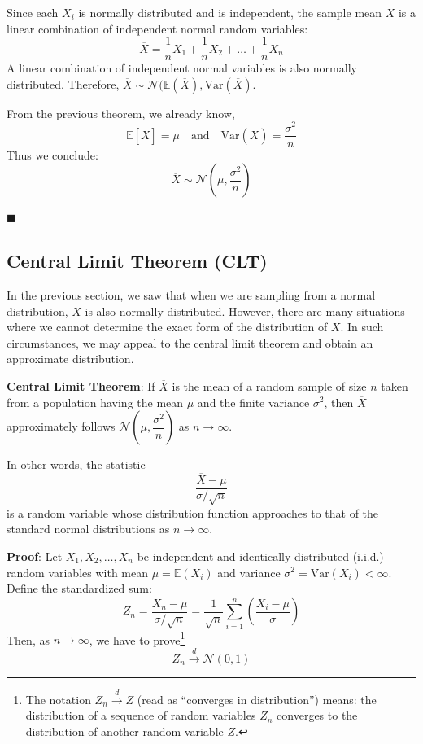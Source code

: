 \documentclass[twoside]{book}
\begin{document}
Since each \( X_i \) is normally distributed and is independent, the sample mean \( \overline{X} \) is a linear combination of independent normal random variables:
\[
\overline{X} = \frac{1}{n} X_1 + \frac{1}{n} X_2 + \dots + \frac{1}{n} X_n
\]
A linear combination of independent normal variables is also normally distributed. Therefore, \( \overline{X} \sim \mathcal{N}(\mathbb{E}(\overline{X}), \mathrm{Var}(\overline{X}) \).

From the previous theorem, we already know,
\[
\mathbb{E}[\overline{X}] = \mu \quad \text{and} \quad \mathrm{Var}(\overline{X}) = \frac{\sigma^2}{n}
\]
Thus we conclude:
\[
\overline{X} \sim \mathcal{N}\left( \mu, \frac{\sigma^2}{n} \right)
\]

\hfill $\blacksquare$
\subsection{Central Limit Theorem (CLT)}
In the previous section, we saw that when we are sampling from a normal distribution, $X$ is also normally distributed. However, there are many situations where we cannot determine the exact form of the distribution of
$X$. In such circumstances, we may appeal to the central limit theorem and obtain an approximate distribution.

\begin{textbox}
\textbf{Central Limit Theorem}: If $\overline{X}$ is the mean of a random sample of size $n$ taken from a population having the mean $\mu$ and the finite variance $\sigma^2$, then $\overline{X}$ approximately follows $\mathcal{N}\left(\mu, \dfrac{\sigma^2}{n}\right)$ as $n \to \infty$.

In other words, the statistic
$$\dfrac{\overline{X}-\mu}{{\sigma}/{\sqrt{n}}}$$
is a random variable whose distribution function approaches to that of the standard normal distributions as $n \to \infty$.
\end{textbox}
\textbf{Proof}: Let $X_1, X_2, \dots, X_n$ be independent and identically distributed (i.i.d.) random variables with mean $\mu = \mathbb{E}(X_i)$ and variance $\sigma^2 = \text{Var}(X_i) < \infty$. Define the standardized sum:
\[
Z_n = \frac{\overline{X}_n - \mu}{\sigma / \sqrt{n}} = \frac{1}{\sqrt{n}} \sum_{i=1}^n \left( \frac{X_i - \mu}{\sigma} \right)
\]
Then, as $n \to \infty$, we have to prove\footnote{The notation \( Z_n \xrightarrow{d} Z \) (read as ``converges in distribution'') means: the distribution of a sequence of random variables \( Z_n \) converges to the distribution of another random variable \( Z \).}
\[
Z_n \xrightarrow{d} \mathcal{N}(0,1)
\]
\end{document}
